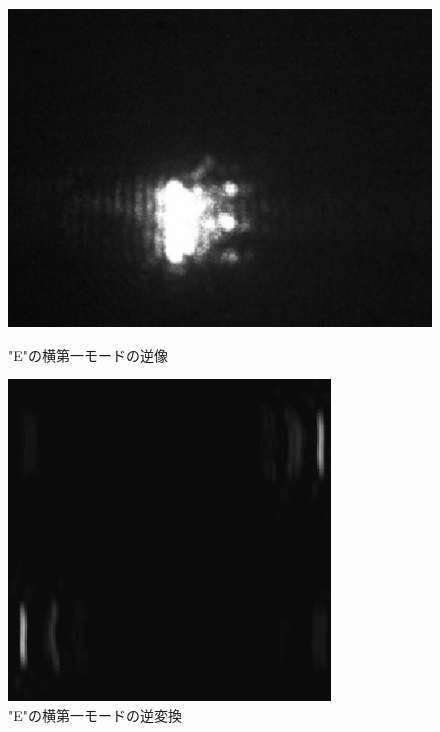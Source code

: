 \documentclass[11pt,a4]{jarticle}
\begin{document}
\begin{figure}[htbp]
 \begin{minipage}{0.55\hsize}
   \begin{center}
    \includegraphics[width=0.9\hsize]{./E_yoko1_exp.eps}
    \caption{"E"の横第一モードの逆像}
     \label{fig:E_yoko1_exp}
   \end{center}
 \end{minipage}
 \begin{minipage}{0.45\hsize}
   \begin{center}
    \includegraphics[width=0.9\hsize]{./E_yoko1_comp.eps}
    \caption{"E"の横第一モードの逆変換}
     \label{fig:E_yoko1_comp}
   \end{center}
 \end{minipage}
\end{figure}
\end{document}
